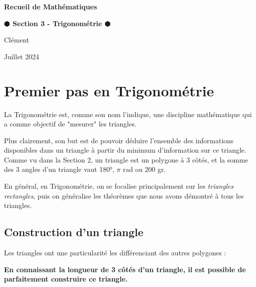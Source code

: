 \documentclass[a4paper]{article}
\begin{document}
	\begin{titlepage}
		\begin{center}
		
			\Huge	 \textbf{Recueil de Mathématiques}\\
			\bigskip \smallskip
		
			\Large	 \textbf{$\varhexagonblack$ Section 3 - Trigonométrie $\varhexagonblack$}\\
			\bigskip
		
			\large	 Clément   \\ 
			\smallskip
		
			\normalfont Juillet 2024 \\
		
		\end{center}
		
		\doublespacing
		\tableofcontents
		\singlespacing

	\end{titlepage}





	\section{Premier pas en Trigonométrie}

		La Trigonométrie est, comme son nom l'indique, une discipline mathématique qui a comme objectif de "mesurer" les triangles.

		Plus clairement, son but est de pouvoir déduire l'ensemble des informations disponibles dans un 
		triangle à partir du minimum d'information sur ce triangle.
		Comme vu dans la Section 2, un triangle est un polygone à 3 côtés, 
		et la somme des 3 angles d'un triangle vaut 180°, $\pi$ rad ou 200 gr.

		En général, en Trigonométrie, on se focalise principalement sur les \textit{triangles rectangles}, 
		puis on généralise les théorèmes que nous avons démontré à tous les triangles.

		\subsection{Construction d'un triangle}
	
			Les triangles ont une particularité les différenciant des autres polygones :

			\textbf{En connaissant la longueur de 3 côtés d'un triangle, il est possible de parfaitement construire ce triangle.}
\end{document}
